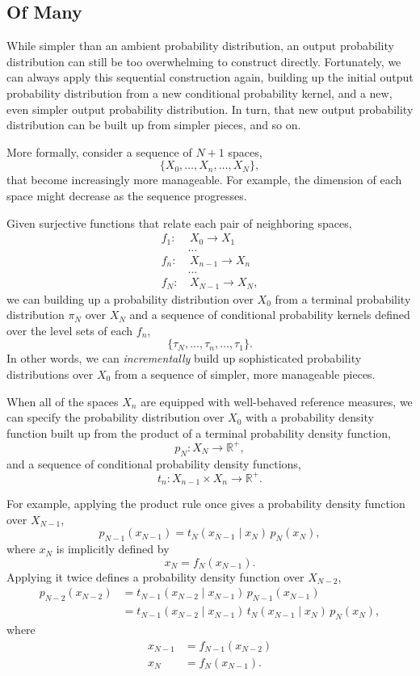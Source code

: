 \documentclass[
  letterpaper,
  DIV=11,
  numbers=noendperiod]{scrartcl}
\begin{document}
\subsection{Of Many}\label{of-many}

While simpler than an ambient probability distribution, an output
probability distribution can still be too overwhelming to construct
directly. Fortunately, we can always apply this sequential construction
again, building up the initial output probability distribution from a
new conditional probability kernel, and a new, even simpler output
probability distribution. In turn, that new output probability
distribution can be built up from simpler pieces, and so on.

More formally, consider a sequence of \(N + 1\) spaces, \[
\{ X_{0}, \ldots, X_{n}, \ldots, X_{N} \},
\] that become increasingly more manageable. For example, the dimension
of each space might decrease as the sequence progresses.

Given surjective functions that relate each pair of neighboring spaces,
\begin{align*}
f_{1} :& \, X_{0} \rightarrow X_{1}
\\
&\ldots
\\
f_{n} :& \, X_{n - 1} \rightarrow X_{n}
\\
&\ldots
\\
f_{N} :& \, X_{N - 1} \rightarrow X_{N},
\end{align*} we can building up a probability distribution over
\(X_{0}\) from a terminal probability distribution \(\pi_{N}\) over
\(X_{N}\) and a sequence of conditional probability kernels defined over
the level sets of each \(f_{n}\), \[
\{ \tau_{N}, \ldots, \tau_{n}, \ldots, \tau_{1} \}.
\] In other words, we can \emph{incrementally} build up sophisticated
probability distributions over \(X_{0}\) from a sequence of simpler,
more manageable pieces.

When all of the spaces \(X_{n}\) are equipped with well-behaved
reference measures, we can specify the probability distribution over
\(X_{0}\) with a probability density function built up from the product
of a terminal probability density function, \[
p_{N} : X_{N} \rightarrow \mathbb{R}^{+},
\] and a sequence of conditional probability density functions, \[
t_{n} : X_{n - 1} \times X_{n} \rightarrow \mathbb{R}^{+}.
\]

For example, applying the product rule once gives a probability density
function over \(X_{N - 1}\), \[
p_{N - 1}( x_{N - 1} ) =
t_{N}( x_{N - 1} \mid x_{N} ) \,
p_{N} ( x_{N} ),
\] where \(x_{N}\) is implicitly defined by \[
x_{N} = f_{N}( x_{N - 1} ).
\] Applying it twice defines a probability density function over
\(X_{N - 2}\), \begin{align*}
p_{N - 2}( x_{N - 2} )
&=
t_{N - 1}( x_{N - 2} \mid x_{N - 1} ) \,
p_{N - 1} ( x_{N - 1} )
\\
&=
t_{N - 1}( x_{N - 2} \mid x_{N - 1} ) \,
t_{N}( x_{N - 1} \mid x_{N} ) \,
p_{N} (x_{N} ),
\end{align*} where \begin{align*}
x_{N - 1} &= f_{N - 1}( x_{N - 2} )
\\
x_{N}     &= f_{N}( x_{N - 1} ).
\end{align*}
\end{document}
